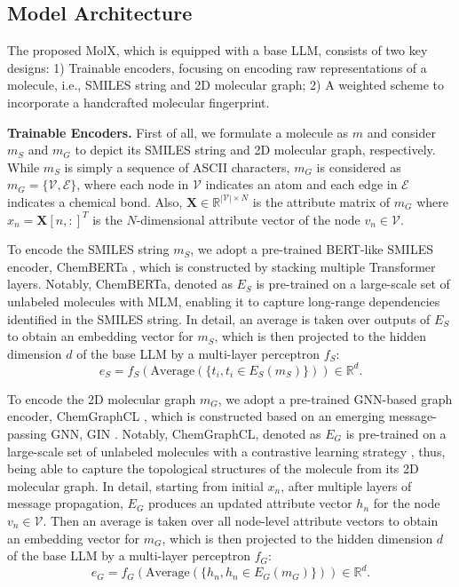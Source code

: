 \subsection{Model Architecture}
The proposed MolX, which is equipped with a base LLM, consists of two key designs: 1) Trainable encoders, focusing on encoding raw representations of a molecule, i.e., SMILES string and 2D molecular graph; 2) A weighted scheme to incorporate a handcrafted molecular fingerprint. 

\noindent
\textbf{Trainable Encoders.} First of all, we formulate a molecule as $m$ and consider $m_S$ and $m_G$ to depict its SMILES string and 2D molecular graph, respectively. While $m_S$ is simply a sequence of ASCII characters, $m_G$ is considered as $m_G = \{\mathcal{V}, \mathcal{E}\}$, where each node in $\mathcal{V}$ indicates an atom and each edge in $\mathcal{E}$ indicates a chemical bond. Also, $\boldsymbol{X} \in \mathbb{R}^{|\mathcal{V}| \times N}$ is the attribute matrix of $m_G$ where $x_n = \boldsymbol{X}[n, :]^T$ is the $N$-dimensional attribute vector of the node $v_n \in \mathcal{V}$. 

\noindent
To encode the SMILES string $m_S$, we adopt a pre-trained BERT-like \cite{devlin2019bert} SMILES encoder, ChemBERTa \cite{ahmad2022chemberta}, which is constructed by stacking multiple Transformer layers. Notably, ChemBERTa, denoted as $E_S$ is pre-trained on a large-scale set of unlabeled molecules with MLM, enabling it to capture long-range dependencies identified in the SMILES string. In detail, an average is taken over outputs of $E_S$ to obtain an embedding vector for $m_S$, which is then projected to the hidden dimension $d$ of the base LLM by a multi-layer perceptron $f_S$: 
\begin{equation}
e_S = f_S(\text{Average}(\{t_i, t_i \in E_S(m_S)\})) \in \mathbb{R}^d. 
\end{equation}

\noindent
To encode the 2D molecular graph $m_G$, we adopt a pre-trained GNN-based graph encoder, ChemGraphCL \cite{you2020graph}, which is constructed based on an emerging message-passing GNN, GIN \cite{yifan2020measuring}. Notably, ChemGraphCL, denoted as $E_G$ is pre-trained on a large-scale set of unlabeled molecules with a contrastive learning strategy \cite{radford2021learning}, thus, being able to capture the topological structures of the molecule from its 2D molecular graph. In detail, starting from initial $x_n$, after multiple layers of message propagation, $E_G$ produces an updated attribute vector $h_n$ for the node $v_n \in \mathcal{V}$. Then an average is taken over all node-level attribute vectors to obtain an embedding vector for $m_G$, which is then projected to the hidden dimension $d$ of the base LLM by a multi-layer perceptron $f_G$: 
\begin{equation}
e_G = f_G(\text{Average}(\{h_n, h_n \in E_G(m_G)\})) \in \mathbb{R}^d. 
\end{equation}

